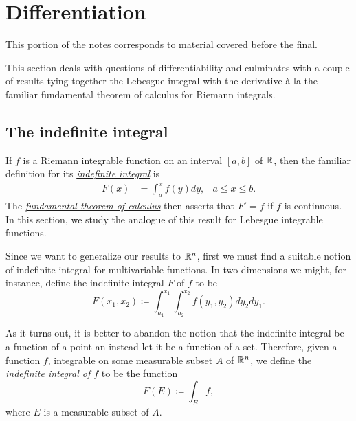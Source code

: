 \section{Differentiation}
This portion of the notes corresponds to material covered before the final.

This section deals with questions of differentiability and culminates with
a couple of results tying together the Lebesgue integral with the
derivative à la the familiar fundamental theorem of calculus for Riemann
integrals.

\subsection{The indefinite integral}
If $f$ is a Riemann integrable function on an interval $[a,b]$ of $\mathbb{R}$,
then the familiar definition for its
\href{https://en.wikipedia.org/wiki/Antiderivative}{\emph{indefinite
    integral}} is
\begin{equation}
\label{eq:3:indefinite-integral}
\begin{aligned}
F(x)&=\int_a^xf(y)dy,&a\leq x\leq b.
\end{aligned}
\end{equation}
The
\href{https://en.wikipedia.org/wiki/Fundamental_theorem_of_calculus}{\emph{fundamental
    theorem of calculus}} then asserts that $F'=f$ if $f$ is continuous. In
this section, we study the analogue of this result for Lebesgue integrable
functions.

Since we want to generalize our results to $\mathbb{R}^n$, first we must find a
suitable notion of indefinite integral for multivariable functions. In two
dimensions we might, for instance, define the indefinite integral $F$ of
$f$ to be
\begin{equation}
\label{eq:3:2-dim-indefinite-integral}
F(x_1,x_2)\coloneqq \int_{a_1}^{x_1}\int_{a_2}^{x_2}f(y_1,y_2)dy_2dy_1.
\end{equation}

As it turns out, it is better to abandon the notion that the indefinite
integral be a function of a point an instead let it be a function of
a set. Therefore, given a function $f$, integrable on some measurable
subset $A$ of $\mathbb{R}^n$, we define the \emph{indefinite integral of $f$} to
be the function
\begin{equation}
  \label{eq:3:lebesgue-indefinite-integral}
F(E)\coloneqq \int_E f,
\end{equation}
where $E$ is a measurable subset of $A$.

